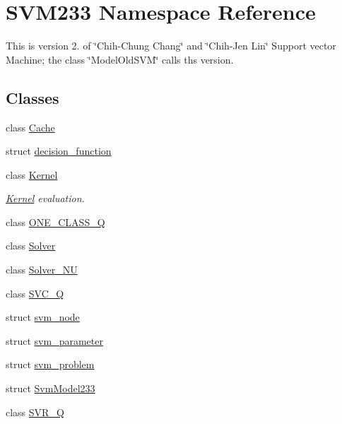 \hypertarget{namespace_s_v_m233}{}\section{S\+V\+M233 Namespace Reference}
\label{namespace_s_v_m233}


This is version 2. of \char`\"{}\+Chih-\/\+Chung Chang\char`\"{} and \char`\"{}\+Chih-\/\+Jen Lin\char`\"{} Support vector Machine; the class \char`\"{}\+Model\+Old\+S\+V\+M\char`\"{} calls ths version.  


\subsection*{Classes}
\begin{DoxyCompactItemize}
\item 
class \hyperlink{class_s_v_m233_1_1_cache}{Cache}
\item 
struct \hyperlink{struct_s_v_m233_1_1decision__function}{decision\+\_\+function}
\item 
class \hyperlink{class_s_v_m233_1_1_kernel}{Kernel}
\begin{DoxyCompactList}\small\item\em \hyperlink{class_s_v_m233_1_1_kernel}{Kernel} evaluation. \end{DoxyCompactList}\item 
class \hyperlink{class_s_v_m233_1_1_o_n_e___c_l_a_s_s___q}{O\+N\+E\+\_\+\+C\+L\+A\+S\+S\+\_\+Q}
\item 
class \hyperlink{class_s_v_m233_1_1_solver}{Solver}
\item 
class \hyperlink{class_s_v_m233_1_1_solver___n_u}{Solver\+\_\+\+NU}
\item 
class \hyperlink{class_s_v_m233_1_1_s_v_c___q}{S\+V\+C\+\_\+Q}
\item 
struct \hyperlink{struct_s_v_m233_1_1svm__node}{svm\+\_\+node}
\item 
struct \hyperlink{struct_s_v_m233_1_1svm__parameter}{svm\+\_\+parameter}
\item 
struct \hyperlink{struct_s_v_m233_1_1svm__problem}{svm\+\_\+problem}
\item 
struct \hyperlink{struct_s_v_m233_1_1_svm_model233}{Svm\+Model233}
\item 
class \hyperlink{class_s_v_m233_1_1_s_v_r___q}{S\+V\+R\+\_\+Q}
\end{DoxyCompactItemize}
